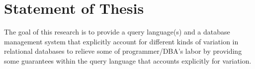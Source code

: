 \section{Statement of Thesis}
\label{sec:stmt}
The goal of this research is to provide a query language(s) and a database management 
system that explicitly account for different kinds of variation in relational databases to relieve 
some of programmer/DBA's labor by providing some guarantees within the query 
language that accounts explicitly for variation.



